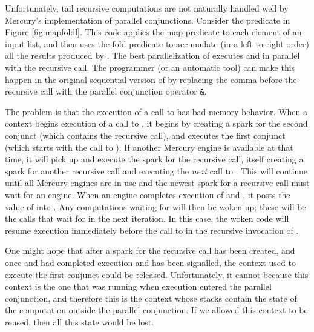 Unfortunately, tail recursive computations are not naturally handled well
by Mercury's implementation of parallel conjunctions.
Consider the \mapfoldl{} predicate in Figure \ref{fig:mapfoldl}.
This code applies the map predicate  to each element of an input list,
and then uses the fold predicate 
to accumulate (in a left-to-right order) all the results produced by .
The best parallelization of \mapfoldl{} executes
 and  in parallel with the recursive call.
The programmer (or an automatic tool) can make this happen
in the original sequential version of \mapfoldl
by replacing the comma before the recursive call
with the parallel conjunction operator \verb'&'.

The problem is that the execution of a call to \mapfoldlpar{}
has bad memory behavior.
When a context begins execution of a call to \mapfoldl{},
it begins by creating a spark for the second conjunct
(which contains the recursive call),
and executes the first conjunct (which starts with the call to ).
If another Mercury engine is available at that time,
it will pick up and execute the spark for the recursive call,
itself creating a spark for another recursive call
and executing the \emph{next} call to .
This will continue until all Mercury engines are in use
and the newest spark for a recursive call %
must wait for an %
engine.
When an engine completes execution of  and ,
it posts the value of  into .
Any computations waiting for  will then be woken up;
these will be the calls that wait for  in the next iteration.
In this case, the woken code will resume execution
immediately before the call to 
in the recursive invocation of \mapfoldlpar{}.

One might hope that after a spark for the recursive call has been created,
and once  and  had completed execution
and  has been signalled,
the context used to execute the first conjunct could be released.
Unfortunately, it cannot because this context is the one that was running
when execution entered the parallel conjunction,
and therefore this is the context whose stacks
contain the state of the computation outside the parallel conjunction.
If we allowed this context to be reused,
then all this state would be lost.

